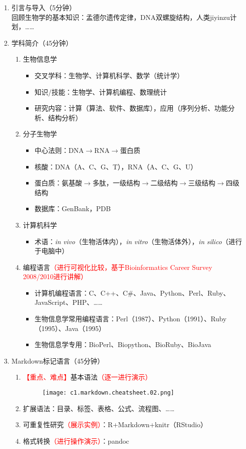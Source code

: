 \documentclass{TIJMUjiaoanLL}
\begin{document}
\begin{enumerate}
  \item 引言与导入（5分钟）
    \\回顾生物学的基本知识：孟德尔遗传定律，DNA双螺旋结构，人类jiyinzu计划，……
  \item 学科简介（45分钟）
    \begin{enumerate}
      \item 生物信息学
	\begin{itemize}
	  \item 交叉学科：生物学、计算机科学、数学（统计学）
	  \item 知识/技能：生物学、计算机编程、数理统计
	  \item 研究内容：计算（算法、软件、数据库），应用（序列分析、功能分析、结构分析）
	\end{itemize}
      \item 分子生物学
	\begin{itemize}
	  \item 中心法则：DNA$\rightarrow$RNA$\rightarrow$蛋白质
	  \item 核酸：DNA（A、C、G、T），RNA（A、C、G、U）
	  \item 蛋白质：氨基酸$\rightarrow$多肽，一级结构$\rightarrow$二级结构$\rightarrow$三级结构$\rightarrow$四级结构
	  \item 数据库：GenBank，PDB
	\end{itemize}
      \item 计算机科学
	\begin{itemize}
	  \item 术语：\textit{in vivo}（生物活体内），\textit{in vitro}（生物活体外），\textit{in silico}（进行于电脑中）
	\end{itemize}
      \item 编程语言\textcolor{red}{（进行可视化比较，基于Bioinformatics Career Survey 2008/2010进行讲解）}
	\begin{itemize}
	  \item 计算机编程语言：C、C++、C\#、Java、Python、Perl、Ruby、JavaScript、PHP、……
	  \item 生物信息学常用编程语言：Perl（1987）、Python（1991）、Ruby（1995）、Java（1995）
	  \item 生物信息学专用：BioPerl、Biopython、BioRuby、BioJava
	\end{itemize}
    \end{enumerate}
  \item Markdown标记语言（45分钟）
    \begin{enumerate}
      \item \textcolor{red}{【重点、难点】}基本语法\textcolor{red}{（逐一进行演示）}
	\begin{figure}[h]
	  \centering
	  \texttt{[image: c1.markdown.cheatsheet.02.png]}
	\end{figure}
      \item 扩展语法：目录、标签、表格、公式、流程图、……
      \item 可重复性研究\textcolor{red}{（展示实例）}：R+Markdown+knitr（RStudio）
      \item 格式转换\textcolor{red}{（进行操作演示）}：pandoc
    \end{enumerate}


\end{enumerate}
\end{document}
